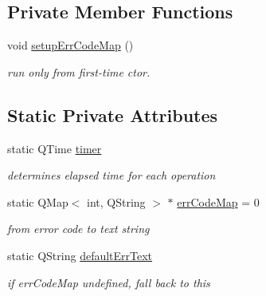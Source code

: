 \subsection*{Private Member Functions}
\begin{CompactItemize}
\item 
\hypertarget{classTrStatus_888d52c5083943e68fceb80c80fbbdc7}{
void \hyperlink{classTrStatus_888d52c5083943e68fceb80c80fbbdc7}{setupErrCodeMap} ()}
\label{classTrStatus_888d52c5083943e68fceb80c80fbbdc7}

\begin{CompactList}\small\item\em run only from first-time ctor. \item\end{CompactList}\end{CompactItemize}
\subsection*{Static Private Attributes}
\begin{CompactItemize}
\item 
\hypertarget{classTrStatus_4684f4d71f6c53c635d6bf8aeaea2756}{
static QTime \hyperlink{classTrStatus_4684f4d71f6c53c635d6bf8aeaea2756}{timer}}
\label{classTrStatus_4684f4d71f6c53c635d6bf8aeaea2756}

\begin{CompactList}\small\item\em determines elapsed time for each operation \item\end{CompactList}\item 
\hypertarget{classTrStatus_db5a5bf8eab67be71eede7971d4fd572}{
static QMap$<$ int, QString $>$ $\ast$ \hyperlink{classTrStatus_db5a5bf8eab67be71eede7971d4fd572}{errCodeMap} = 0}
\label{classTrStatus_db5a5bf8eab67be71eede7971d4fd572}

\begin{CompactList}\small\item\em from error code to text string \item\end{CompactList}\item 
\hypertarget{classTrStatus_76a299bf7c90c3d22f31ffdbd5b8e1e5}{
static QString \hyperlink{classTrStatus_76a299bf7c90c3d22f31ffdbd5b8e1e5}{defaultErrText}}
\label{classTrStatus_76a299bf7c90c3d22f31ffdbd5b8e1e5}

\begin{CompactList}\small\item\em if errCodeMap undefined, fall back to this \item\end{CompactList}\end{CompactItemize}



